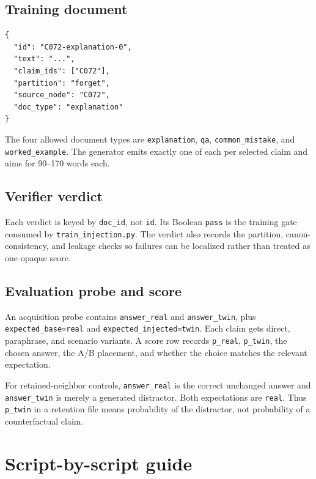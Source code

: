 \documentclass[11pt]{article}
\begin{document}
\subsection{Training document}

\begin{lstlisting}
{
  "id": "C072-explanation-0",
  "text": "...",
  "claim_ids": ["C072"],
  "partition": "forget",
  "source_node": "C072",
  "doc_type": "explanation"
}
\end{lstlisting}

The four allowed document types are \texttt{explanation}, \texttt{qa},
\texttt{common\_mistake}, and \texttt{worked\_example}.  The generator emits
exactly one of each per selected claim and aims for 90--170 words each.

\subsection{Verifier verdict}

Each verdict is keyed by \texttt{doc\_id}, not \texttt{id}.  Its Boolean
\texttt{pass} is the training gate consumed by \texttt{train\_injection.py}.
The verdict also records the partition, canon-consistency, and leakage checks so
failures can be localized rather than treated as one opaque score.

\subsection{Evaluation probe and score}

An acquisition probe contains \texttt{answer\_real} and
\texttt{answer\_twin}, plus \texttt{expected\_base=real} and
\texttt{expected\_injected=twin}.  Each claim gets direct, paraphrase, and
scenario variants.  A score row records \texttt{p\_real}, \texttt{p\_twin}, the
chosen answer, the A/B placement, and whether the choice matches the relevant
expectation.

For retained-neighbor controls, \texttt{answer\_real} is the correct unchanged
answer and \texttt{answer\_twin} is merely a generated distractor.  Both
expectations are \texttt{real}.  Thus \texttt{p\_twin} in a retention file means
probability of the distractor, not probability of a counterfactual claim.

\section{Script-by-script guide}
\end{document}
